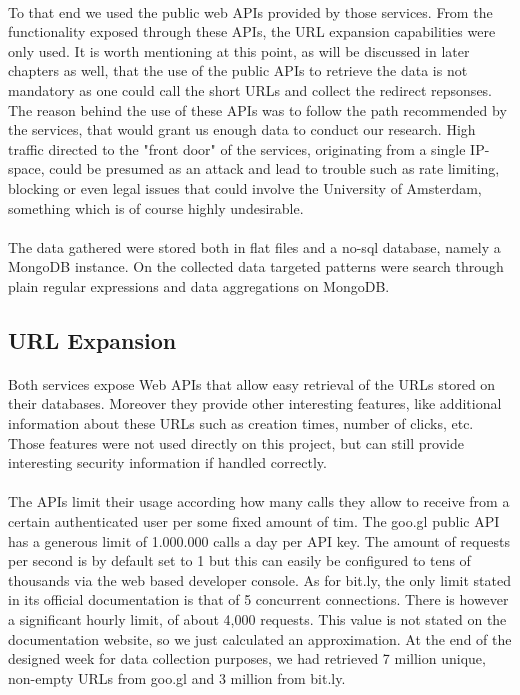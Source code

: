 \documentclass[12pt]{article}
\begin{document}
\paragraph{}
To that end we used the public web APIs provided by those services. From the functionality exposed through these APIs, the URL expansion capabilities were only used. It is worth mentioning at this point, as will be discussed in later chapters as well, that the use of the public APIs to retrieve the data is not mandatory as one could call the short URLs and collect the redirect repsonses. The reason behind the use of these APIs was to follow the path recommended by the services, that would grant us enough data to conduct our research. High traffic directed to the "front door" of the services, originating from a single IP-space, could be presumed as an attack and lead to trouble such as rate limiting, blocking or even legal issues that could involve the University of Amsterdam, something which is of course highly undesirable. 

\paragraph{}
The data gathered were stored both in flat files and a no-sql database, namely a MongoDB instance. On the collected data targeted patterns were search through plain regular expressions and data aggregations on MongoDB. 

\subsection{URL Expansion}

\paragraph{}
Both services expose Web APIs that allow easy retrieval of the URLs stored on their databases. Moreover they provide other interesting features, like additional information about these URLs such as creation times, number of clicks, etc. Those features were not used directly on this project, but can still provide interesting security information if handled correctly. 

\paragraph{}
The APIs limit their usage according how many calls they allow to receive from a certain authenticated user per some fixed amount of tim. The goo.gl public API has a generous limit of 1.000.000 calls a day per API key. The amount of requests per second is by default set to 1 but this can easily be configured to tens of thousands via the web based developer console. As for bit.ly, the only limit stated in its official documentation is that of 5 concurrent connections. There is however a significant hourly limit, of  about 4,000 requests. This value is not stated on the documentation website, so we just calculated an approximation. At the end of the designed week for data collection purposes, we had retrieved 7 million unique, non-empty URLs from goo.gl and 3 million from bit.ly.
\end{document}
